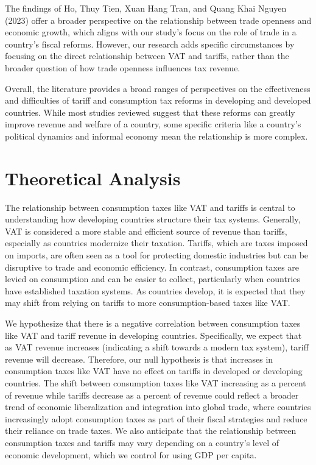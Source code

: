 \documentclass[12pt]{article}
\begin{document}
The findings of Ho, Thuy Tien, Xuan Hang Tran, and Quang Khai Nguyen (2023) offer a broader perspective on the relationship between trade openness and economic growth, which aligns with our study's focus on the role of trade in a country's fiscal reforms. However, our research adds specific circumstances by focusing on the direct relationship between VAT and tariffs, rather than the broader question of how trade openness influences tax revenue.

Overall, the literature provides a broad ranges of perspectives on the effectiveness and difficulties of tariff and consumption tax reforms in developing and developed countries. While most studies reviewed suggest that these reforms can greatly improve revenue and welfare of a country, some specific criteria like a country's political dynamics and informal economy mean the relationship is more complex. 

\section{Theoretical Analysis}
\label{sec:theory}
The relationship between consumption taxes like VAT and tariffs is central to understanding how developing countries structure their tax systems. Generally, VAT is considered a more stable and efficient source of revenue than tariffs, especially as countries modernize their taxation. Tariffs, which are taxes imposed on imports, are often seen as a tool for protecting domestic industries but can be disruptive to trade and economic efficiency. In contrast, consumption taxes are levied on consumption and can be easier to collect, particularly when countries have established taxation systems. As countries develop, it is expected that they may shift from relying on tariffs to more consumption-based taxes like VAT.

We hypothesize that there is a negative correlation between consumption taxes like VAT and tariff revenue in developing countries. Specifically, we expect that as VAT revenue increases (indicating a shift towards a modern tax system), tariff revenue will decrease. Therefore, our null hypothesis is that increases in consumption taxes like VAT have no effect on tariffs in developed or developing countries. 
The shift between consumption taxes like VAT increasing as a percent of revenue while tariffs decrease as a percent of revenue could reflect a broader trend of economic liberalization and integration into global trade, where countries increasingly adopt consumption taxes as part of their fiscal strategies and reduce their reliance on trade taxes. We also anticipate that the relationship between consumption taxes and tariffs may vary depending on a country's level of economic development, which we control for using GDP per capita.
\end{document}
